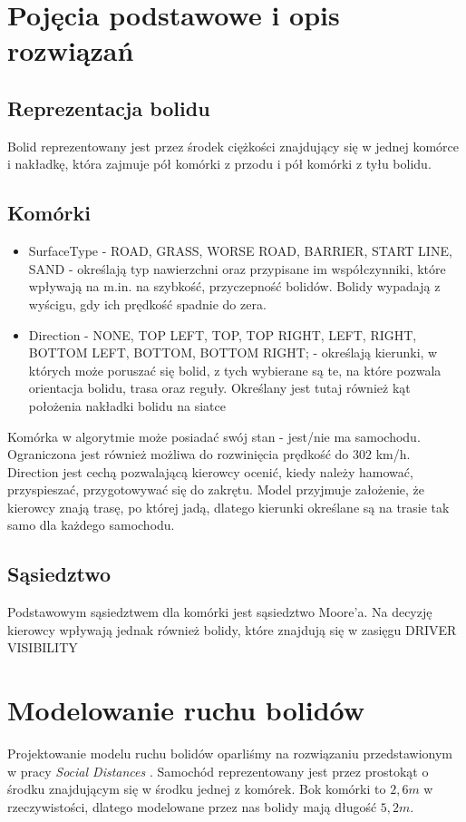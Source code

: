 \documentclass{article}
\begin{document}
\section{Pojęcia podstawowe i opis rozwiązań}
\subsection{Reprezentacja bolidu}
Bolid reprezentowany jest przez środek ciężkości znajdujący się w jednej komórce i nakładkę, która zajmuje pół komórki z przodu i pół komórki z tyłu bolidu.

\subsection{Komórki}
\begin{itemize}
\item SurfaceType - ROAD, GRASS, WORSE ROAD, BARRIER, START LINE, SAND - określają typ nawierzchni oraz przypisane im współczynniki, które wpływają na m.in. na szybkość, przyczepność bolidów. Bolidy wypadają z wyścigu, gdy ich prędkość spadnie do zera.
\item Direction -  NONE, TOP LEFT, TOP, TOP RIGHT, LEFT, RIGHT, BOTTOM LEFT, BOTTOM, BOTTOM RIGHT; - określają kierunki, w których może poruszać się bolid, z tych wybierane są te, na które pozwala orientacja bolidu, trasa oraz reguły. Określany jest tutaj również kąt położenia nakładki bolidu na siatce
\end{itemize}

Komórka w algorytmie może posiadać swój stan - jest/nie ma samochodu. Ograniczona jest również możliwa do rozwinięcia prędkość do $302$ km/h. \\

Direction jest cechą pozwalającą kierowcy ocenić, kiedy należy hamować, przyspieszać, przygotowywać się do zakrętu. Model przyjmuje założenie, że kierowcy znają trasę, po której jadą, dlatego kierunki określane są na trasie tak samo dla każdego samochodu.

\subsection{Sąsiedztwo}
Podstawowym sąsiedztwem dla komórki jest sąsiedztwo Moore'a. Na decyzję kierowcy wpływają jednak również bolidy, które znajdują się w zasięgu DRIVER VISIBILITY

\section{Modelowanie ruchu bolidów}
Projektowanie modelu ruchu bolidów oparliśmy na rozwiązaniu przedstawionym w pracy \textit{Social Distances} \cite{was}. Samochód reprezentowany jest przez prostokąt o środku znajdującym się w środku jednej z komórek. Bok komórki to $2,6 m$ w rzeczywistości, dlatego modelowane przez nas bolidy mają długość $5,2 m$.
\end{document}
